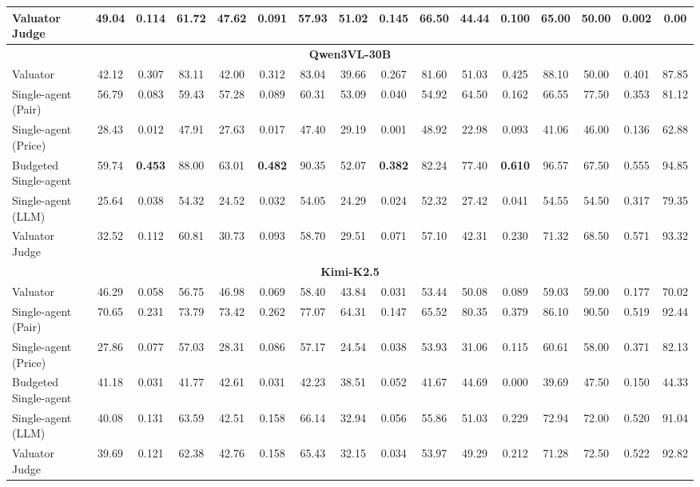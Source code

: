 \begin{table}[!t]
{\begin{tabular}{lccccccccccccccc}
Valuator Judge               & 49.04 & 0.114 & 61.72 & 47.62 & 0.091 & 57.93 & 51.02 & 0.145 & 66.50 & 44.44 & 0.100 & 65.00 & 50.00 & 0.002 & 0.00 \\
\midrule
\multicolumn{16}{c}{\textbf{Qwen3VL-30B}} \\
\midrule
Valuator                     & 42.12 & 0.307 & 83.11 & 42.00 & 0.312 & 83.04 & 39.66 & 0.267 & 81.60 & 51.03 & 0.425 & 88.10 & 50.00 & 0.401 & 87.85 \\
Single-agent (Pair)          & 56.79 & 0.083 & 59.43 & 57.28 & 0.089 & 60.31 & 53.09 & 0.040 & 54.92 & 64.50 & 0.162 & 66.55 & 77.50 & 0.353 & 81.12 \\
Single-agent (Price)         & 28.43 & 0.012 & 47.91 & 27.63 & 0.017 & 47.40 & 29.19 & 0.001 & 48.92 & 22.98 & 0.093 & 41.06 & 46.00 & 0.136 & 62.88 \\
Budgeted Single-agent        & 59.74 & \textbf{0.453} & 88.00 & 63.01 & \textbf{0.482} & 90.35 & 52.07 & \textbf{0.382} & 82.24 & 77.40 & \textbf{0.610} & 96.57 & 67.50 & 0.555 & 94.85 \\
Single-agent (LLM)           & 25.64 & 0.038 & 54.32 & 24.52 & 0.032 & 54.05 & 24.29 & 0.024 & 52.32 & 27.42 & 0.041 & 54.55 & 54.50 & 0.317 & 79.35 \\
Valuator Judge               & 32.52 & 0.112 & 60.81 & 30.73 & 0.093 & 58.70 & 29.51 & 0.071 & 57.10 & 42.31 & 0.230 & 71.32 & 68.50 & 0.571 & 93.32 \\
\midrule
\multicolumn{16}{c}{\textbf{Kimi-K2.5}} \\
\midrule
Valuator                     & 46.29 & 0.058 & 56.75 & 46.98 & 0.069 & 58.40 & 43.84 & 0.031 & 53.44 & 50.08 & 0.089 & 59.03 & 59.00 & 0.177 & 70.02 \\
Single-agent (Pair)          & 70.65 & 0.231 & 73.79 & 73.42 & 0.262 & 77.07 & 64.31 & 0.147 & 65.52 & 80.35 & 0.379 & 86.10 & 90.50 & 0.519 & 92.44 \\
Single-agent (Price)         & 27.86 & 0.077 & 57.03 & 28.31 & 0.086 & 57.17 & 24.54 & 0.038 & 53.93 & 31.06 & 0.115 & 60.61 & 58.00 & 0.371 & 82.13 \\
Budgeted Single-agent        & 41.18 & 0.031 & 41.77 & 42.61 & 0.031 & 42.23 & 38.51 & 0.052 & 41.67 & 44.69 & 0.000 & 39.69 & 47.50 & 0.150 & 44.33 \\
Single-agent (LLM)           & 40.08 & 0.131 & 63.59 & 42.51 & 0.158 & 66.14 & 32.94 & 0.056 & 55.86 & 51.03 & 0.229 & 72.94 & 72.00 & 0.520 & 91.04 \\
Valuator Judge               & 39.69 & 0.121 & 62.38 & 42.76 & 0.158 & 65.43 & 32.15 & 0.034 & 53.97 & 49.29 & 0.212 & 71.28 & 72.50 & 0.522 & 92.82 \\

\end{tabular}}
\end{table}
